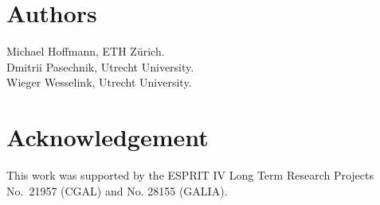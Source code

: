 
\pagestyle{plain}
\setcounter{page}{1}
\newpage


\lcTex{\vspace*{2cm}}

\section*{Authors}

Michael Hoffmann, ETH Z\"urich.\\
Dmitrii Pasechnik, Utrecht University.\\
Wieger Wesselink, Utrecht University.

\section*{Acknowledgement}

This work was supported by the ESPRIT IV Long Term Research Projects
No.~21957 (CGAL) and No. 28155 (GALIA).


